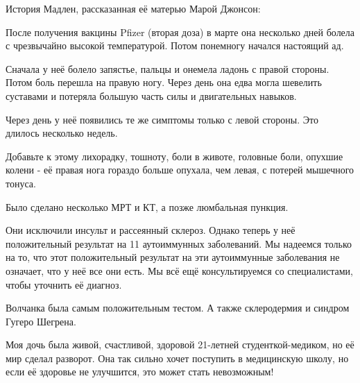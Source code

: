 История Мадлен, рассказанная её матерью Марой Джонсон:

После получения вакцины Pfizer (вторая доза) в марте она несколько дней болела с
чрезвычайно высокой температурой. Потом понемногу начался настоящий ад.

Сначала у неё болело запястье, пальцы и онемела ладонь с правой стороны. Потом
боль перешла на правую ногу. Через день она едва могла шевелить суставами и
потеряла большую часть силы и двигательных навыков.

Через день у неё появились те же симптомы только с левой стороны. Это длилось
несколько недель.

Добавьте к этому лихорадку, тошноту, боли в животе, головные боли, опухшие
колени - её правая нога гораздо больше опухала, чем левая, с потерей мышечного
тонуса.

Было сделано несколько МРТ и КТ, а позже люмбальная пункция.

Они исключили инсульт и рассеянный склероз. Однако теперь у неё положительный
результат на 11 аутоиммунных заболеваний. Мы надеемся только на то, что этот
положительный результат на эти аутоиммунные заболевания не означает, что у неё
все они есть. Мы всё ещё консультируемся со специалистами, чтобы уточнить её
диагноз.

Волчанка была самым положительным тестом. А также склеродермия и синдром Гугеро
Шегрена.

Моя дочь была живой, счастливой, здоровой 21-летней студенткой-медиком, но её
мир сделал разворот. Она так сильно хочет поступить в медицинскую школу, но если
её здоровье не улучшится, это может стать невозможным!
